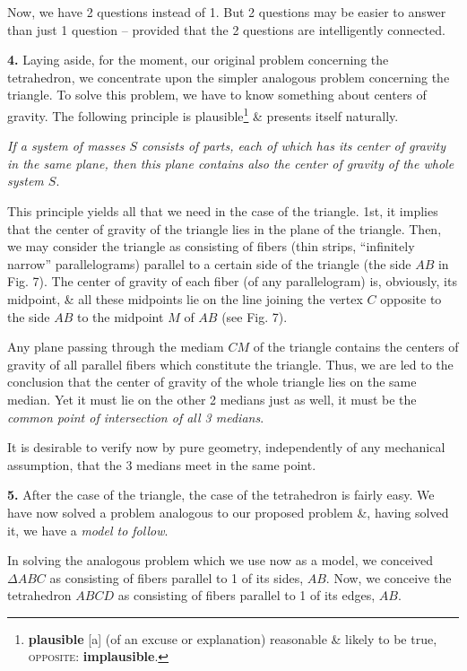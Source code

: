 \documentclass[oneside]{book}
\numberwithin{equation}{section}
\begin{document}
Now, we have 2 questions instead of 1. But 2 questions may be easier to answer than just 1 question -- provided that the 2 questions are intelligently connected.

\textbf{4.} Laying aside, for the moment, our original problem concerning the tetrahedron, we concentrate upon the simpler analogous problem concerning the triangle. To solve this problem, we have to know something about centers of gravity. The following principle is plausible\footnote{\textbf{plausible} [a] (of an excuse or explanation) reasonable \& likely to be true, \textsc{opposite}: \textbf{implausible}.} \& presents itself naturally.

\textit{If a system of masses $S$ consists of parts, each of which has its center of gravity in the same plane, then this plane contains also the center of gravity of the whole system $S$}.

This principle yields all that we need in the case of the triangle. 1st, it implies that the center of gravity of the triangle lies in the plane of the triangle. Then, we may consider the triangle as consisting of fibers (thin strips, ``infinitely narrow'' parallelograms) parallel to a certain side of the triangle (the side $AB$ in Fig. 7). The center of gravity of each fiber (of any parallelogram) is, obviously, its midpoint, \& all these midpoints lie on the line joining the vertex $C$ opposite to the side $AB$ to the midpoint $M$ of $AB$ (see Fig. 7).

Any plane passing through the mediam $CM$ of the triangle contains the centers of gravity of all parallel fibers which constitute the triangle. Thus, we are led to the conclusion that the center of gravity of the whole triangle lies on the same median. Yet it must lie on the other 2 medians just as well, it must be the \textit{common point of intersection of all 3 medians}.

It is desirable to verify now by pure geometry, independently of any mechanical assumption, that the 3 medians meet in the same point.

\textbf{5.} After the case of the triangle, the case of the tetrahedron is fairly easy. We have now solved a problem analogous to our proposed problem \&, having solved it, we have a \textit{model to follow}.

In solving the analogous problem which we use now as a model, we conceived $\Delta ABC$ as consisting of fibers parallel to 1 of its sides, $AB$. Now, we conceive the tetrahedron $ABCD$ as consisting of fibers parallel to 1 of its edges, $AB$.
\end{document}
